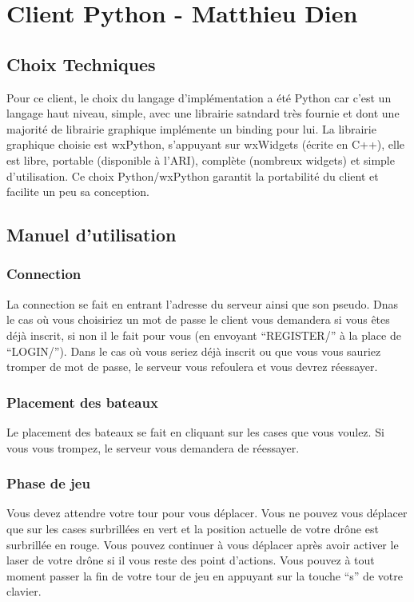 \documentclass[a4paper, 11pt]{report}
\begin{document}
\chapter{Client Python - Matthieu Dien}

\section{Choix Techniques}

Pour ce client, le choix du langage d'implémentation a été Python car c'est un langage haut niveau, simple, 
avec une librairie satndard très fournie et dont une majorité de librairie graphique implémente
un binding pour lui. La librairie graphique choisie est wxPython, s'appuyant sur wxWidgets (écrite en C++), elle est libre, portable 
(disponible à l'ARI), complète (nombreux widgets) et simple d'utilisation.
Ce choix Python/wxPython garantit la portabilité du client et facilite un peu sa conception.

\section{Manuel d'utilisation}
\subsection{Connection}
La connection se fait en entrant l'adresse du serveur ainsi que son pseudo. Dnas le cas où vous choisiriez un mot de passe le client 
vous demandera si vous êtes déjà inscrit, si non il le fait pour vous (en envoyant ``REGISTER/'' à la place de ``LOGIN/''). Dans le cas où vous seriez déjà 
inscrit ou que vous vous sauriez tromper de mot de passe, le serveur vous refoulera et vous devrez réessayer.

\subsection{Placement des bateaux}
Le placement des bateaux se fait en cliquant sur les cases que vous voulez. Si vous vous trompez, le serveur vous demandera de réessayer.

\subsection{Phase de jeu}
Vous devez attendre votre tour pour vous déplacer. Vous ne pouvez vous déplacer que sur les cases surbrillées en vert et la position 
actuelle de votre drône est surbrillée en rouge. Vous pouvez continuer à vous déplacer après avoir activer le laser de votre drône si il vous reste des point d'actions. 
Vous pouvez à tout moment passer la fin de votre tour de jeu en appuyant sur la touche ``s'' de votre clavier.
\end{document}

